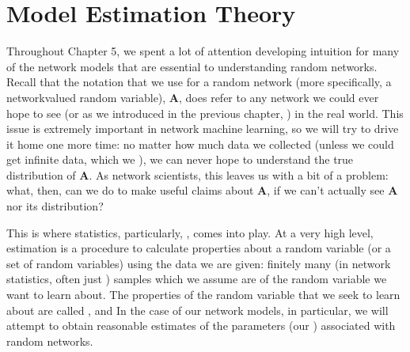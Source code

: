 \documentclass[letterpaper,10pt,english]{jupyterBook}
\begin{document}
\section{Model Estimation Theory}
\label{\detokenize{representations/ch6/estimating-parameters_theory:model-estimation-theory}}\label{\detokenize{representations/ch6/estimating-parameters_theory::doc}}
\sphinxAtStartPar
Throughout Chapter 5, we spent a lot of attention developing intuition for many of the network models that are essential to understanding random networks. Recall that the notation that we use for a random network (more specifically, a network\sphinxhyphen{}valued random variable), \(\mathbf A\), does  refer to any network we could ever hope to see (or as we introduced in the previous chapter, ) in the real world. This issue is extremely important in network machine learning, so we will try to drive it home one more time: no matter how much data we collected (unless we could get infinite data, which we ), we can never hope to understand the true distribution of \(\mathbf A\). As network scientists, this leaves us with a bit of a problem: what, then, can we do to make useful claims about \(\mathbf A\), if we can’t actually see \(\mathbf A\) nor its distribution?

\sphinxAtStartPar
This is where statistics, particularly, , comes into play. At a very high level, estimation is a procedure to calculate properties about a random variable (or a set of random variables) using  the data we are given: finitely many (in network statistics, often just ) samples which we assume are  of the random variable we want to learn about. The properties of the random variable that we seek to learn about are called , and  In the case of our network models, in particular, we will attempt to obtain reasonable estimates of the parameters (our ) associated with random networks.
\end{document}
